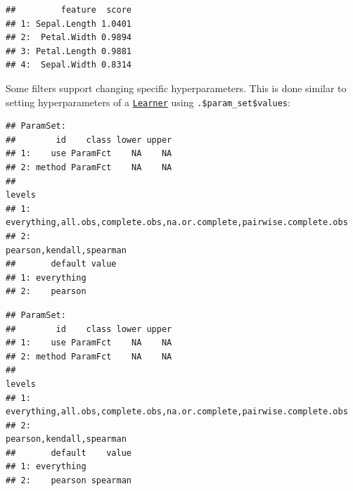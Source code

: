 \documentclass[]{scrbook}
\newenvironment{Shaded}{\begin{snugshade}}{\end{snugshade}}
\newcommand{\CommentTok}[1]{\textcolor[rgb]{0.56,0.35,0.01}{\textit{#1}}}
\newcommand{\DataTypeTok}[1]{\textcolor[rgb]{0.13,0.29,0.53}{#1}}
\newcommand{\KeywordTok}[1]{\textcolor[rgb]{0.13,0.29,0.53}{\textbf{#1}}}
\newcommand{\NormalTok}[1]{#1}
\newcommand{\OperatorTok}[1]{\textcolor[rgb]{0.81,0.36,0.00}{\textbf{#1}}}
\newcommand{\StringTok}[1]{\textcolor[rgb]{0.31,0.60,0.02}{#1}}
\renewenvironment{Shaded} {\begin{snugshade}\small} {\end{snugshade}}
\begin{document}
\begin{verbatim}
##         feature  score
## 1: Sepal.Length 1.0401
## 2:  Petal.Width 0.9894
## 3: Petal.Length 0.9881
## 4:  Sepal.Width 0.8314
\end{verbatim}

Some filters support changing specific hyperparameters.
This is done similar to setting hyperparameters of a \href{https://mlr3.mlr-org.com/reference/Learner.html}{\texttt{Learner}} using \texttt{.\$param\_set\$values}:

\begin{Shaded}
\end{Shaded}

\begin{verbatim}
## ParamSet: 
##        id    class lower upper
## 1:    use ParamFct    NA    NA
## 2: method ParamFct    NA    NA
##                                                                  levels
## 1: everything,all.obs,complete.obs,na.or.complete,pairwise.complete.obs
## 2:                                             pearson,kendall,spearman
##       default value
## 1: everything      
## 2:    pearson
\end{verbatim}

\begin{Shaded}
\end{Shaded}

\begin{verbatim}
## ParamSet: 
##        id    class lower upper
## 1:    use ParamFct    NA    NA
## 2: method ParamFct    NA    NA
##                                                                  levels
## 1: everything,all.obs,complete.obs,na.or.complete,pairwise.complete.obs
## 2:                                             pearson,kendall,spearman
##       default    value
## 1: everything         
## 2:    pearson spearman
\end{verbatim}
\end{document}
